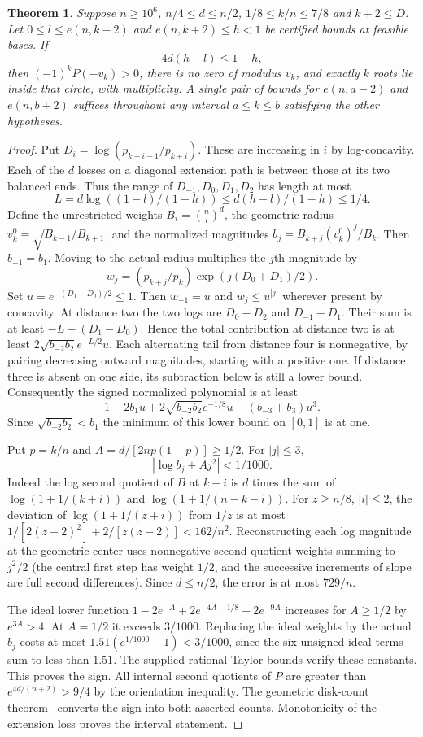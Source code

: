 \documentclass[11pt]{article}
\newtheorem{theorem}{Theorem}
\begin{document}
\begin{theorem}\label{test}
Suppose $n\ge10^6$, $n/4\le d\le n/2$, $1/8\le k/n\le7/8$ and $k+2\le D$. Let $0\le l\le e(n,k-2)$ and $e(n,k+2)\le h<1$ be certified bounds at feasible bases. If
\[
4d(h-l)\le1-h ,
\]
then $(-1)^k P(-v_k)>0$, there is no zero of modulus $v_k$, and exactly $k$ roots lie inside that circle, with multiplicity. A single pair of bounds for $e(n,a-2)$ and $e(n,b+2)$ suffices throughout any interval $a\le k\le b$ satisfying the other hypotheses.
\end{theorem}
\begin{proof}
Put $D_i=\log(p_{k+i-1}/p_{k+i})$. These are increasing in $i$ by log-concavity. Each of the $d$ losses on a diagonal extension path is between those at its two balanced ends. Thus the range of $D_{-1},D_0,D_1,D_2$ has length at most
\[
L=d\log((1-l)/(1-h))\le d(h-l)/(1-h)\le1/4.
\]
Define the unrestricted weights $B_i=\binom ni^d$, the geometric radius $v_k^0=\sqrt{B_{k-1}/B_{k+1}}$, and the normalized magnitudes $b_j=B_{k+j}(v_k^0)^j/B_k$. Then $b_{-1}=b_1$. Moving to the actual radius multiplies the $j$th magnitude by
\[
w_j=(p_{k+j}/p_k)\exp(j(D_0+D_1)/2).
\]
Set $u=e^{-(D_1-D_0)/2}\le1$. Then $w_{\pm1}=u$ and $w_j\le u^{|j|}$ wherever present by concavity. At distance two the two logs are $D_0-D_2$ and $D_{-1}-D_1$. Their sum is at least $-L-(D_1-D_0)$. Hence the total contribution at distance two is at least $2\sqrt{b_{-2}b_2}e^{-L/2}u$. Each alternating tail from distance four is nonnegative, by pairing decreasing outward magnitudes, starting with a positive one. If distance three is absent on one side, its subtraction below is still a lower bound. Consequently the signed normalized polynomial is at least
\[
1-2b_1u+2\sqrt{b_{-2}b_2}e^{-1/8}u-(b_{-3}+b_3)u^3 .
\]
Since $\sqrt{b_{-2}b_2}<b_1$ the minimum of this lower bound on $[0,1]$ is at one.

Put $p=k/n$ and $A=d/[2np(1-p)]\ge1/2$. For $|j|\le3$,
\[
|\log b_j+Aj^2|<1/1000 .
\]
Indeed the log second quotient of $B$ at $k+i$ is $d$ times the sum of $\log(1+1/(k+i))$ and $\log(1+1/(n-k-i))$. For $z\ge n/8$, $|i|\le2$, the deviation of $\log(1+1/(z+i))$ from $1/z$ is at most $1/[2(z-2)^2]+2/[z(z-2)]<162/n^2$. Reconstructing each log magnitude at the geometric center uses nonnegative second-quotient weights summing to $j^2/2$ (the central first step has weight $1/2$, and the successive increments of slope are full second differences). Since $d\le n/2$, the error is at most $729/n$.

The ideal lower function $1-2e^{-A}+2e^{-4A-1/8}-2e^{-9A}$ increases for $A\ge1/2$ by $e^{3A}>4$. At $A=1/2$ it exceeds $3/1000$. Replacing the ideal weights by the actual $b_j$ costs at most $1.51(e^{1/1000}-1)<3/1000$, since the six unsigned ideal terms sum to less than $1.51$. The supplied rational Taylor bounds verify these constants. This proves the sign. All internal second quotients of $P$ are greater than $e^{4d/(n+2)}>9/4$ by the orientation inequality. The geometric disk-count theorem~\cite{sharp} converts the sign into both asserted counts. Monotonicity of the extension loss proves the interval statement.
\end{proof}
\end{document}
